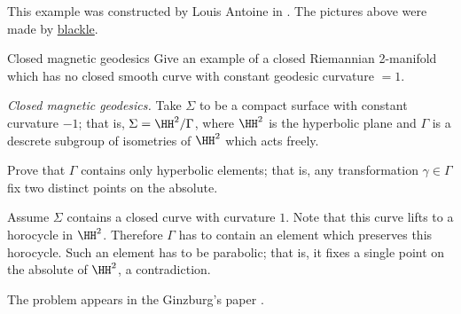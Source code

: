 This example was constructed by Louis Antoine in \cite{antoine}.
The pictures above were made by \href{http://en.wikipedia.org/wiki/User:Blacklemon67}{blackle}.


























\begin{pr}{}{Closed magnetic geodesics}\label{twisted-geodesic} %
Give an example of a closed Riemannian 
2-manifold which has no closed smooth curve with constant geodesic curvature $=1$.
\end{pr}

\textit{Closed magnetic geodesics.}
Take $\Sigma$ to be a compact surface with constant curvature $-1$;
that is, 
 $\Sigma=\HH^2/\Gamma$,
where $\HH^2$
is the hyperbolic plane 
and $\Gamma$ is a descrete subgroup of isometries of $\HH^2$ which acts freely.

Prove that $\Gamma$ contains only hyperbolic elements; that is, any transformation $\gamma\in\Gamma$ fix two distinct points on the absolute.

Assume $\Sigma$ contains a closed curve with curvature $1$.
Note that this curve lifts to a horocycle in $\HH^2$.
Therefore $\Gamma$ has to contain an element which preserves this horocycle.
Such an element has to be parabolic;
that is, it fixes a single point on the absolute of $\HH^2$,
 a contradiction.

The problem appears in the Ginzburg's paper \cite{ginzburg}.












